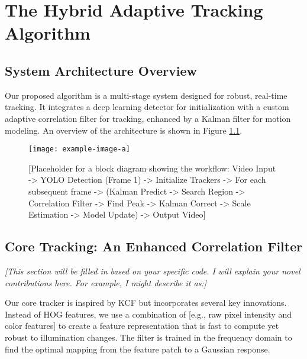 \documentclass[12pt, a4paper]{report}
\begin{document}

\chapter{The Hybrid Adaptive Tracking Algorithm}

\section{System Architecture Overview}
Our proposed algorithm is a multi-stage system designed for robust, real-time tracking. It integrates a deep learning detector for initialization with a custom adaptive correlation filter for tracking, enhanced by a Kalman filter for motion modeling. An overview of the architecture is shown in Figure \ref{fig:architecture}.

\begin{figure}[H]
    \centering
    \texttt{[image: example-image-a]} 
    \caption{[Placeholder for a block diagram showing the workflow: Video Input -> YOLO Detection (Frame 1) -> Initialize Trackers -> For each subsequent frame -> (Kalman Predict -> Search Region -> Correlation Filter -> Find Peak -> Kalman Correct -> Scale Estimation -> Model Update) -> Output Video]}
    \label{fig:architecture}
\end{figure}

\section{Core Tracking: An Enhanced Correlation Filter}
\label{sec:core_tracker} 
\textit{[This section will be filled in based on your specific code. I will explain your novel contributions here. For example, I might describe it as:]}

Our core tracker is inspired by KCF but incorporates several key innovations. Instead of HOG features, we use a combination of [e.g., raw pixel intensity and color features] to create a feature representation that is fast to compute yet robust to illumination changes. The filter is trained in the frequency domain to find the optimal mapping from the feature patch to a Gaussian response.
\end{document}
